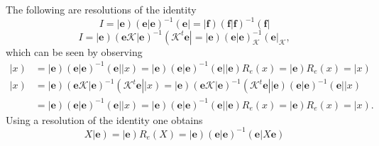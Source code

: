 \documentclass[aps,preprint]{revtex4}%
\begin{document}
The following are resolutions of the identity%
\begin{equation}
I=\left\vert \mathbf{e}\right)  \left(  \left.  \mathbf{e}\right\vert
\mathbf{e}\right)  ^{-1}\left(  \mathbf{e}\right\vert =\left\vert
\mathbf{f}\right)  \left(  \left.  \mathbf{f}\right\vert \mathbf{f}\right)
^{-1}\left(  \mathbf{f}\right\vert
\end{equation}%
\begin{equation}
I=\left\vert \mathbf{e}\right)  \left(  \left.  \mathbf{e}\mathcal{K}%
\right\vert \mathbf{e}\right)  ^{-1}\left(  \mathcal{K}^{t}\mathbf{e}%
\right\vert =\left\vert \mathbf{e}\right)  \left(  \left.  \mathbf{e}%
\right\vert \mathbf{e}\right)  _{\mathcal{K}}^{-1}\left(  \mathbf{e}%
\right\vert _{\mathcal{K}},
\end{equation}
which can be seen by observing
\begin{align}
\left\vert x\right)   &  =\left\vert \mathbf{e}\right)  \left(  \left.
\mathbf{e}\right\vert \mathbf{e}\right)  ^{-1}\left(  \mathbf{e}\right\vert
\left\vert x\right)  =\left\vert \mathbf{e}\right)  \left(  \left.
\mathbf{e}\right\vert \mathbf{e}\right)  ^{-1}\left(  \mathbf{e}\right\vert
\left\vert \mathbf{e}\right)  R_{e}\left(  x\right)  =\left\vert
\mathbf{e}\right)  R_{e}\left(  x\right)  =\left\vert x\right) \\
\left\vert x\right)   &  =\left\vert \mathbf{e}\right)  \left(  \left.
\mathbf{e}\mathcal{K}\right\vert \mathbf{e}\right)  ^{-1}\left(
\mathcal{K}^{t}\mathbf{e}\right\vert \left\vert x\right)  =\left\vert
\mathbf{e}\right)  \left(  \left.  \mathbf{e}\mathcal{K}\right\vert
\mathbf{e}\right)  ^{-1}\left(  \mathcal{K}^{t}\mathbf{e}\right\vert
\left\vert \mathbf{e}\right)  \left(  \left.  \mathbf{e}\right\vert
\mathbf{e}\right)  ^{-1}\left(  \mathbf{e}\right\vert \left\vert x\right) \\
&  =\left\vert \mathbf{e}\right)  \left(  \left.  \mathbf{e}\right\vert
\mathbf{e}\right)  ^{-1}\left(  \mathbf{e}\right\vert \left\vert x\right)
=\left\vert \mathbf{e}\right)  \left(  \left.  \mathbf{e}\right\vert
\mathbf{e}\right)  ^{-1}\left(  \mathbf{e}\right\vert \left\vert
\mathbf{e}\right)  R_{e}\left(  x\right)  =\left\vert \mathbf{e}\right)
R_{e}\left(  x\right)  =\left\vert x\right)  .
\end{align}
Using a resolution of the identity one obtains
\begin{equation}
X\left\vert \mathbf{e}\right)  =\left\vert \mathbf{e}\right)  R_{e}\left(
X\right)  =\left\vert \mathbf{e}\right)  \left(  \left.  \mathbf{e}\right\vert
\mathbf{e}\right)  ^{-1}\left(  \left.  \mathbf{e}\right\vert X\mathbf{e}%
\right)
\end{equation}
\end{document}
